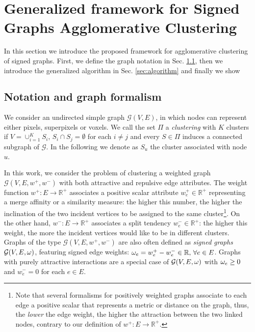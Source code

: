 
\section{Generalized framework for Signed Graphs Agglomerative Clustering}
In this section we introduce the proposed framework for agglomerative clustering of signed graphs. 
First, we define the graph notation in Sec. \ref{sec:notation}, then we introduce the generalized algorithm in Sec. \ref{sec:algorithm} and finally we show 

\subsection{Notation and graph formalism} \label{sec:notation}

We consider an undirected simple graph $\mathcal{G}(V,E)$, in which nodes can represent either pixels, superpixels or voxels. We call the set $\Pi$ a \emph{clustering} with $K$ clusters if $V = \cup_{i=1}^K S_i $, $S_i \cap S_j = \emptyset$ for each $i\neq j$ and every $S \in \Pi$ induces a connected subgraph of $\mathcal{G}$. In the following we denote as $S_u$ the cluster associated with node $u$.

In this work, we consider the problem of clustering a weighted graph $\mathcal{G}(V,E,w^+, w^-)$ with both attractive and repulsive edge attributes. The weight function $w^+: E \rightarrow \mathbb{R}^+$ associates a positive scalar attribute $w_e^+\in \mathbb{R}^+$ representing a merge affinity or a similarity measure: the higher this number, the higher the inclination of the two incident vertices to be assigned to the same cluster\footnote{Note that several formalisms for positively weighted graphs associate to each edge a positive scalar that represents a metric or distance on the graph, thus, the \emph{lower} the edge weight, the higher the attraction between the two linked nodes, contrary to our definition of $w^+: E \rightarrow \mathbb{R}^+$.}. On the other hand, $w^-: E \rightarrow \mathbb{R}^+$ associates a split tendency $w_e^- \in \mathbb{R}^+$: the higher this weight, the more the incident vertices would like to be in different clusters. 
Graphs of the type $\mathcal{G}(V,E,w^+, w^-)$ are also often defined as \emph{signed graphs} $\mathcal{G}(V,E,\omega)$, featuring signed edge weights: ${\omega_e = w_e^+ - w_e^- \in \mathbb{R}, \, \forall e \in E}$.
Graphs with purely attractive interactions are a special case of $\mathcal{G}(V,E,\omega)$ with $\omega_e \geq 0$ and $w^-_e=0$ for each $e \in E$.

